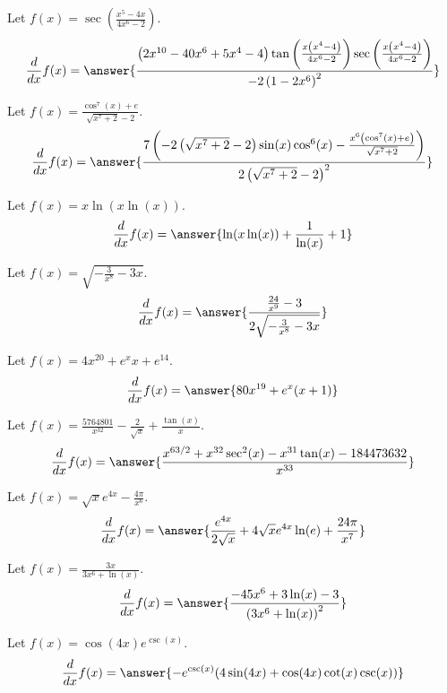 \documentclass{ximera}
\begin{document}
\begin{shuffle}
\begin{exercise}
Let $f(x)=\sec \left(\frac{x^5-4 x}{4 x^6-2}\right)$.
\[
\ddx f(x) = \answer{\frac{\left(2 x^{10}-40 x^6+5 x^4-4\right) \tan \left(\frac{x \left(x^4-4\right)}{4 x^6-2}\right) \sec \left(\frac{x \left(x^4-4\right)}{4 x^6-2}\right)}{-2 \left(1-2 x^6\right)^2}}
\]
\end{exercise}

\begin{exercise}
Let $f(x)=\frac{\cos ^7(x)+e}{\sqrt{x^7+2}-2}$.
\[
\ddx f(x) = \answer{\frac{7 \left(-2 \left(\sqrt{x^7+2}-2\right) \sin (x) \cos ^6(x)-\frac{x^6 \left(\cos ^7(x)+e\right)}{\sqrt{x^7+2}}\right)}{2 \left(\sqrt{x^7+2}-2\right)^2}}
\]
\end{exercise}

\begin{exercise}
Let $f(x)=x \ln (x \ln (x))$.
\[
\ddx f(x) = \answer{\ln (x \ln (x))+\frac{1}{\ln (x)}+1}
\]
\end{exercise}

\begin{exercise}
Let $f(x)=\sqrt{-\frac{3}{x^8}-3 x}$.
\[
\ddx f(x) = \answer{\frac{\frac{24}{x^9}-3}{2 \sqrt{-\frac{3}{x^8}-3 x}}}
\]
\end{exercise}

\begin{exercise}
Let $f(x)=4 x^{20}+e^x x+e^{14}$.
\[
\ddx f(x) = \answer{80 x^{19}+e^x (x+1)}
\]
\end{exercise}

\begin{exercise}
Let $f(x)=\frac{5764801}{x^{32}}-\frac{2}{\sqrt{x}}+\frac{\tan (x)}{x}$.
\[
\ddx f(x) = \answer{\frac{x^{63/2}+x^{32} \sec ^2(x)-x^{31} \tan (x)-184473632}{x^{33}}}
\]
\end{exercise}

\begin{exercise}
Let $f(x)=\sqrt{x} e^{4 x}-\frac{4 \pi }{x^6}$.
\[
\ddx f(x) = \answer{\frac{e^{4 x}}{2 \sqrt{x}}+4 \sqrt{x} e^{4 x} \ln (e)+\frac{24 \pi }{x^7}}
\]
\end{exercise}

\begin{exercise}
Let $f(x)=\frac{3 x}{3 x^6+\ln (x)}$.
\[
\ddx f(x) = \answer{\frac{-45 x^6+3 \ln (x)-3}{\left(3 x^6+\ln (x)\right)^2}}
\]
\end{exercise}

\begin{exercise}
Let $f(x)=\cos (4 x) e^{\csc (x)}$.
\[
\ddx f(x) = \answer{-e^{\csc (x)} (4 \sin (4 x)+\cos (4 x) \cot (x) \csc (x))}
\]
\end{exercise}


\end{shuffle}
\end{document}

